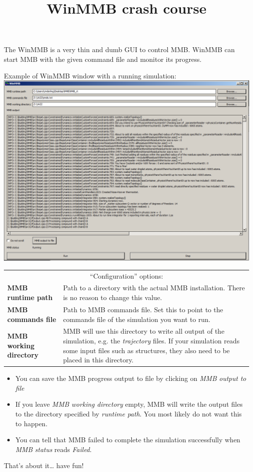 \documentclass{article}
\title{WinMMB crash course}
\date{}
\begin{document}
\maketitle

\noindent The WinMMB is a very thin and dumb GUI to control MMB. WinMMB can start MMB with the given command file and monitor its progress.

\begin{center}
  \noindent Example of WinMMB window with a running simulation: \\
  \vspace{0.5\baselineskip}
  \includegraphics[scale=0.4]{WinMMB.png}
\end{center}

\begin{center}
  \begin{tabular}{lp{7cm}}
    \multicolumn{2}{c}{\enquote{Configuration} options:} \\
    \textbf{MMB runtime path} & Path to a directory with the actual MMB installation. There is no reason to change this value. \\
    \textbf{MMB commands file} & Path to MMB commands file. Set this to point to the commands file of the simulation you want to run. \\
    \textbf{MMB working directory} & MMB will use this directory to write all output of the simulation, e.g. the \emph{trajectory} files. If your simulation reads some input files such as structures, they also need to be placed in this directory.
  \end{tabular}
\end{center}

\begin{itemize}
  \item You can save the MMB progress output to file by clicking on \emph{MMB output to file}
  \item If you leave \emph{MMB working directory} empty, MMB will write the output files to the directory specified by \emph{runtime path}. You most likely do not want this to happen.
  \item You can tell that MMB failed to complete the simulation successfully when \emph{MMB status} reads \emph{Failed}.
\end{itemize}

That's about it\ldots{} have fun!
\end{document}
